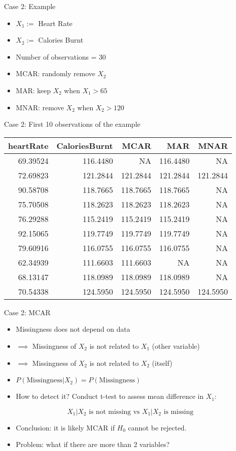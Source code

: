 \documentclass[ignorenonframetext,]{beamer}
\providecommand{\tightlist}{%
  \setlength{\itemsep}{0pt}\setlength{\parskip}{0pt}}
\begin{document}
\begin{frame}{Case 2: Example}

\begin{itemize}
\tightlist
\item
  \(X_{1}:=\) Heart Rate
\item
  \(X_{2}:=\) Calories Burnt
\item
  Number of observations = 30
\item
  MCAR: randomly remove \(X_{2}\)
\item
  MAR: keep \(X_{2}\) when \(X_{1} > 65\)
\item
  MNAR: remove \(X_{2}\) when \(X_{2} > 120\)
\end{itemize}

\end{frame}

\begin{frame}{Case 2: First 10 observations of the example}

\begin{longtable}[]{@{}rrrrr@{}}
\toprule
heartRate & CaloriesBurnt & MCAR & MAR & MNAR\tabularnewline
\midrule
\endhead
69.39524 & 116.4480 & NA & 116.4480 & NA\tabularnewline
72.69823 & 121.2844 & 121.2844 & 121.2844 & 121.2844\tabularnewline
90.58708 & 118.7665 & 118.7665 & 118.7665 & NA\tabularnewline
75.70508 & 118.2623 & 118.2623 & 118.2623 & NA\tabularnewline
76.29288 & 115.2419 & 115.2419 & 115.2419 & NA\tabularnewline
92.15065 & 119.7749 & 119.7749 & 119.7749 & NA\tabularnewline
79.60916 & 116.0755 & 116.0755 & 116.0755 & NA\tabularnewline
62.34939 & 111.6603 & 111.6603 & NA & NA\tabularnewline
68.13147 & 118.0989 & 118.0989 & 118.0989 & NA\tabularnewline
70.54338 & 124.5950 & 124.5950 & 124.5950 & 124.5950\tabularnewline
\bottomrule
\end{longtable}

\end{frame}

\begin{frame}{Case 2: MCAR}

\begin{itemize}
\tightlist
\item
  Missingness does not depend on data
\item
  \(\implies\) Missingness of \(X_{2}\) is not related to \(X_{1}\)
  (other variable)
\item
  \(\implies\) Missingness of \(X_{2}\) is not related to \(X_{2}\)
  (itself)
\item
  \(P(\text{Missingness}|X_{2}) = P(\text{Missingness})\)
\item
  How to detect it? Conduct t-test to assess mean difference in
  \(X_{1}\):
\end{itemize}

\[X_{1} | X_{2} \text{ is not missing vs } X_{1} | X_{2} \text{ is  missing}\]

\begin{itemize}
\tightlist
\item
  Conclusion: it is likely MCAR if \(H_0\) cannot be rejected.
\item
  Problem: what if there are more than 2 variables?
\end{itemize}

\end{frame}
\end{document}
